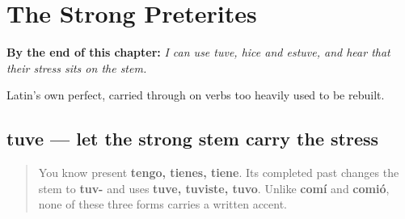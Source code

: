 
\chapter{The Strong Preterites}
\label{ch:spanish-preterito-fuerte}

\begin{chapteropening}
\textbf{By the end of this chapter:} \emph{I can use tuve, hice and estuve, and hear that their stress sits on the stem.}

Latin's own perfect, carried through on verbs too heavily used to be rebuilt.
\end{chapteropening}

\section[tuve]{tuve — let the strong stem carry the stress}

\label{lesson:ES-C15-tener-preterite}



\begin{quote}
You know present \textbf{tengo, tienes, tiene}. Its completed past changes the stem to \textbf{tuv-} and uses \textbf{tuve, tuviste, tuvo}. Unlike \textbf{comí} and \textbf{comió}, none of these three forms carries a written accent.
\end{quote}

